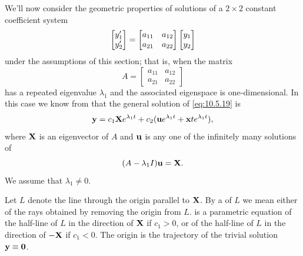 We'll now  consider the geometric properties of solutions of a
$2\times2$ constant coefficient system
\begin{equation} \label{eq:10.5.19}
\begin{bmatrix}y_1'\\y_2'\end{bmatrix}=\begin{bmatrix}
a_{11}&a_{12}\\a_{21}&a_{22}
\end{bmatrix}\begin{bmatrix}y_1\\y_2\end{bmatrix}
\end{equation}
under the assumptions of this section; that is, when the matrix
\[
A=\begin{bmatrix}a_{11}&a_{12}\\a_{21}&a_{22}\end{bmatrix}
\]
has a repeated eigenvalue $\lambda_1$ and the associated eigenspace is
one-dimensional. In this case we know from 
that the general solution of \eqref{eq:10.5.19} is
\begin{equation} \label{eq:10.5.20}
\mathbf{y}=c_1\mathbf{X}e^{\lambda_1t}+c_2(\mathbf{u}e^{\lambda_1t}+\mathbf{x}te^{\lambda_1t}),
\end{equation}
where $\mathbf{X}$ is an eigenvector of $A$ and $\mathbf{u}$ is any one of
the infinitely many solutions of
\begin{equation} \label{eq:10.5.21}
(A-\lambda_1I)\mathbf{u}=\mathbf{X}.
\end{equation}
We assume that $\lambda_1\ne0$.

Let $L$ denote the line through the origin parallel to $\mathbf{X}$. By a
 of $L$ we mean either of the rays obtained by
removing the origin from $L$.  is a parametric
equation of the half-line of $L$ in the direction of $\mathbf{X}$ if
$c_1>0$, or of the half-line of $L$ in the direction of $-\mathbf{X}$ if
$c_1<0$. The origin is the trajectory
of the trivial solution $\mathbf{y}\equiv\mathbf{0}$.

